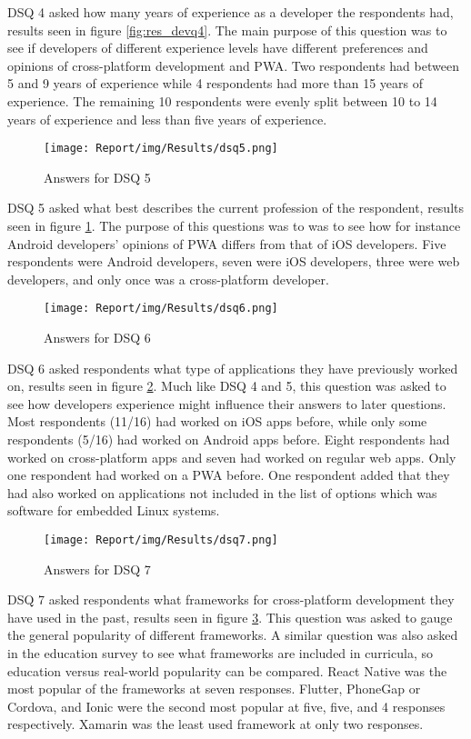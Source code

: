 \documentclass[a4paper,12pt]{article}
\begin{document}
DSQ 4 asked how many years of experience as a developer the respondents had, results seen in figure \ref{fig:res_devq4}. The main purpose of this question was to see if developers of different experience levels have different preferences and opinions of cross-platform development and PWA. Two respondents had between 5 and 9 years of experience while 4 respondents had more than 15 years of experience. The remaining 10 respondents were evenly split between 10 to 14 years of experience and less than five years of experience.

\begin{figure}[ht!]
    \centering
    \texttt{[image: Report/img/Results/dsq5.png]}
    \caption{Answers for DSQ 5}
    \label{fig:res_devq5}
\end{figure}

DSQ 5 asked what best describes the current profession of the respondent, results seen in figure \ref{fig:res_devq5}. The purpose of this questions was to was to see how for instance Android developers' opinions of PWA differs from that of iOS developers. Five respondents were Android developers, seven were iOS developers, three were web developers, and only once was a cross-platform developer. 

\begin{figure}[ht!]
    \centering
    \texttt{[image: Report/img/Results/dsq6.png]}
    \caption{Answers for DSQ 6}
    \label{fig:res_devq6}
\end{figure}

DSQ 6 asked respondents what type of applications they have previously worked on, results seen in figure \ref{fig:res_devq6}. Much like DSQ 4 and 5, this question was asked to see how developers experience might influence their answers to later questions. Most respondents (11/16) had worked on iOS apps before, while only some respondents (5/16) had worked on Android apps before. Eight respondents had worked on cross-platform apps and seven had worked on regular web apps. Only one respondent had worked on a PWA before. One respondent added that they had also worked on applications not included in the list of options which was software for embedded Linux systems. 

\begin{figure}[ht!]
    \centering
    \texttt{[image: Report/img/Results/dsq7.png]}
    \caption{Answers for DSQ 7}
    \label{fig:res_devq7}
\end{figure}

DSQ 7 asked respondents what frameworks for cross-platform development they have used in the past, results seen in figure \ref{fig:res_devq7}. This question was asked to gauge the general popularity of different frameworks. A similar question was also asked in the education survey to see what frameworks are included in curricula, so education versus real-world popularity can be compared. React Native was the most popular of the frameworks at seven responses. Flutter, PhoneGap or Cordova, and Ionic were the second most popular at five, five, and 4 responses respectively. Xamarin was the least used framework at only two responses.
\end{document}
